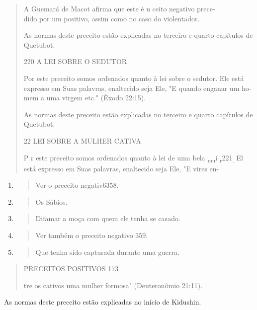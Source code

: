 \begin{quote}
A Guemará de Macot afirma que este é u ceito negativo prece-\\
dido por um positivo, assim como no caso do violentador.

As normas deste preceito estão explicadas no terceiro e quarto
capí­tulos de Quetubot.

220 A LEI SOBRE O SEDUTOR

Por este preceito somos ordenados quanto à lei sobre o sedutor. Ele está
expresso em Suas palavras, enaltecido seja Ele, "E quando enganar um
ho­mem a uma virgem etc." (Êxodo 22:15).

As normas deste preceito estão explicadas no terceiro e quarto
capí­tulos de Quetubot.

22 LEI SOBRE A MULHER CATIVA

P r este preceito somos ordenados quanto à lei de uma bela
\textsubscript{mu}i \textsubscript{r}221\textsubscript{.} El está
expresso em Suas palavras, enaltecido seja Ele, "E vires en-
\end{quote}

\begin{enumerate}
\def\labelenumi{\arabic{enumi}.}
\setcounter{enumi}{216}
\item
  \begin{quote}
  Ver o preceito negativ6358.
  \end{quote}
\item
  \begin{quote}
  Os Sábios.
  \end{quote}
\item
  \begin{quote}
  Difamar a moça com quem ele tenha se casado.
  \end{quote}
\item
  \begin{quote}
  Ver também o preceito negativo 359.
  \end{quote}
\item
  \begin{quote}
  Que tenha sido capturada durante uma guerra.
  \end{quote}
\end{enumerate}

\begin{quote}
PRECEITOS POSITIVOS 173

tre os cativos uma mulher formosa" (Deuteronômio 21:11).
\end{quote}

As normas deste preceito estão explicadas no início de Kidushin.

